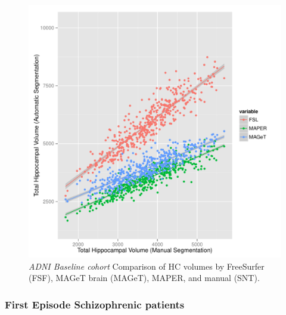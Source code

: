 \documentclass{article}\usepackage{graphicx, color}
\makeatletter
\def\maxwidth{ %
  \ifdim\Gin@nat@width>\linewidth
    \linewidth
  \else
    \Gin@nat@width
  \fi
}
\newenvironment{knitrout}{}{} %
\makeatother
\begin{document}
\begin{figure}[h]
\begin{knitrout}
\color{fgcolor}

{\centering \includegraphics[width=\maxwidth]{figure/ADNI-baseline-volumes-plot} 

}


\end{knitrout}

  \caption{{\em ADNI Baseline cohort} Comparison of HC volumes by FreeSurfer (FSF), MAGeT brain (MAGeT), MAPER, and manual (SNT).}
  \label{ADNI-baseline-volumes-plot}
\end{figure}

\subsubsection{First Episode Schizophrenic patients}
\end{document}
